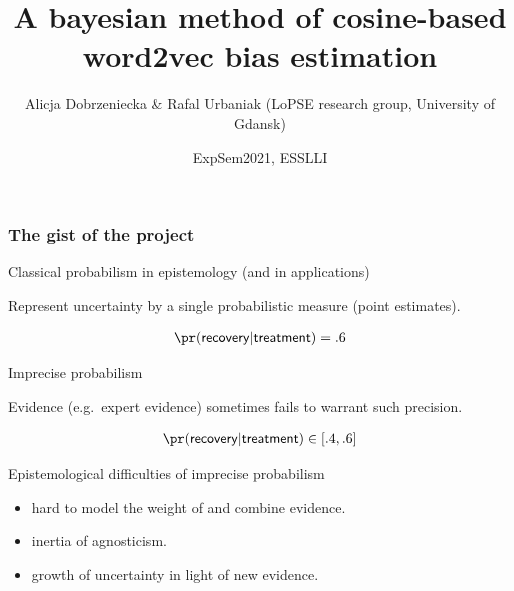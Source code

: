 \documentclass[10pt,ignorenonframetext,x11names, dvipsnames, bibspacing,natbib]{beamer}
\title{\large A bayesian method of cosine-based word2vec bias estimation}
\author{Alicja Dobrzeniecka \& Rafal Urbaniak \footnotesize \newline (LoPSE
research group, University of Gdansk)}
\date{ExpSem2021, ESSLLI}
\begin{document}
\frame{\titlepage}

\begin{frame}

\frametitle{The gist of the project}

\pause

\begin{block}{Classical probabilism in epistemology (and in
applications)}

Represent uncertainty by a single probabilistic measure (point
estimates).

\vspace{-3mm}

\begin{align*}
\pr(\mathsf{recovery}\vert \mathsf{treatment}) & = .6\\
\end{align*}

\vspace{-6mm}

\pause

\end{block}

\begin{block}{Imprecise probabilism}

Evidence (e.g.~expert evidence) sometimes fails to warrant such
precision.

\vspace{-3mm}

\begin{align*}
\pr(\mathsf{recovery}\vert \mathsf{treatment}) & \in [.4,.6]\\
\end{align*}

\vspace{-6mm}

\pause 

\end{block}

\begin{block}{Epistemological difficulties of imprecise probabilism}

\begin{itemize}
\item
  hard to model the weight of and combine evidence.
\item
  inertia of agnosticism.
\item
  growth of uncertainty in light of new evidence.
\end{itemize}

\end{block}

\end{frame}
\end{document}
